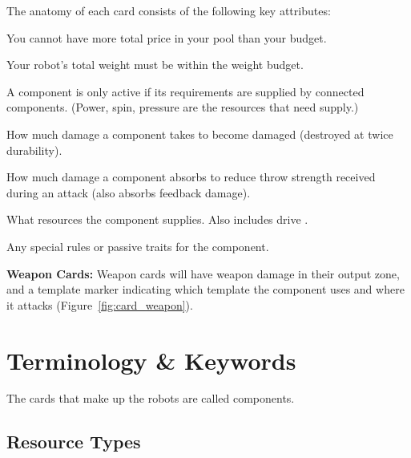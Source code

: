 \documentclass[11pt,a4paper]{article}
\newcommand{\inlineIcon}[1]{\raisebox{-0.22ex}{\resizebox{!}{1.15em}{#1}}}
\newcommand{\inlineChevron}{%
  \raisebox{-0.15ex}{\resizebox{!}{0.95em}{%
    \begin{tikzpicture}
      \fill[chevronpurple] (0, 0.90) -- (0.85, 0) -- (0, -0.90) -- (0, -0.54) -- (0.51, 0) -- (0, 0.54) -- cycle;
    \end{tikzpicture}%
  }}%
}
\begin{document}
The anatomy of each card consists of the following key attributes:

\begin{description}[leftmargin=!, labelwidth=4.2cm, font=\bfseries\color{primaryDark}]
  \item[Price (\textcolor{costgreen}{\textbf{\$X}}):] You cannot have more total price in your pool than your budget.
  \item[Weight (\inlineIcon{\weighticonplain}):] Your robot's total weight must be within the weight budget.
  \item[Requirements (\inlineChevron\inlineIcon{\resourceE}):] A component is only active if its requirements are supplied by connected components. (Power, spin, pressure are the resources that need supply.)
  \item[Durability (\inlineIcon{\durabilityicon}):] How much damage a component takes to become damaged (destroyed at twice durability).
  \item[Absorption (\inlineIcon{\absorptionicon}):] How much damage a component absorbs to reduce throw strength received during an attack (also absorbs feedback damage).
  \item[Outputs (\inlineIcon{\resourceS}\inlineChevron):] What resources the component supplies. Also includes drive \inlineIcon{\resourceM}.
  \item[Ability Text:] Any special rules or passive traits for the component.
\end{description}

\vspace{2pt}
\noindent\textbf{Weapon Cards:} Weapon cards will have weapon damage \inlineIcon{\resourceW} in their output zone, and a template marker indicating which template the component uses and where it attacks (Figure~\ref{fig:card_weapon}).

\clearpage


\section{Terminology \& Keywords}

The cards that make up the robots are called components.

\subsection{Resource Types}
\end{document}

